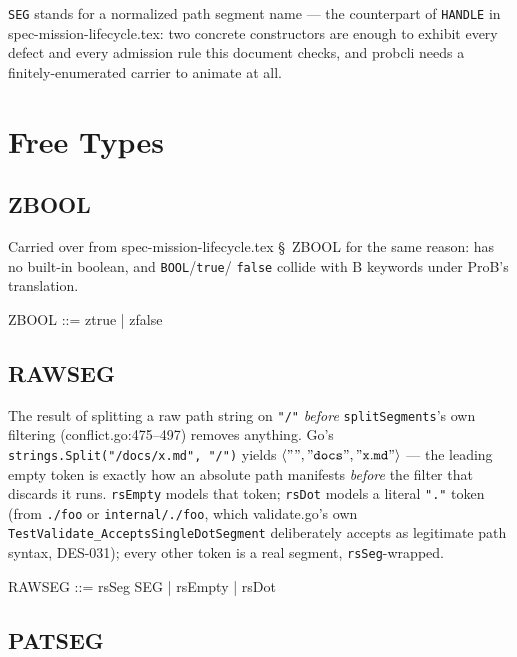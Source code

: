 \documentclass[a4paper,10pt,fleqn]{article}
\newcommand{\field}[1]{\texttt{#1}}
\begin{document}
\field{SEG} stands for a normalized path segment name --- the
counterpart of \field{HANDLE} in spec-mission-lifecycle.tex: two
concrete constructors are enough to exhibit every defect and every
admission rule this document checks, and probcli needs a
finitely-enumerated carrier to animate at all.

\section{Free Types}
\label{sec:freetypes}

\subsection{ZBOOL}

Carried over from spec-mission-lifecycle.tex \S~ZBOOL for the same
reason: \fuzz{} has no built-in boolean, and \field{BOOL}/\field{true}/
\field{false} collide with B keywords under ProB's translation.

\begin{zed}
ZBOOL ::= ztrue | zfalse
\end{zed}

\subsection{RAWSEG}

The result of splitting a raw path string on \texttt{"/"}
\emph{before} \field{splitSegments}'s own filtering
(conflict.go:475--497) removes anything. Go's
\field{strings.Split("/docs/x.md", "/")} yields
$\langle \mathtt{""}, \mathtt{"docs"}, \mathtt{"x.md"} \rangle$ --- the
leading empty token is exactly how an absolute path manifests
\emph{before} the filter that discards it runs. \field{rsEmpty}
models that token; \field{rsDot} models a literal \texttt{"."} token
(from \texttt{./foo} or \texttt{internal/./foo}, which
validate.go's own \field{TestValidate\_AcceptsSingleDotSegment}
deliberately accepts as legitimate path syntax, DES-031); every other
token is a real segment, \field{rsSeg}-wrapped.

\begin{zed}
RAWSEG ::= rsSeg \ldata SEG \rdata | rsEmpty | rsDot
\end{zed}

\subsection{PATSEG}
\end{document}
